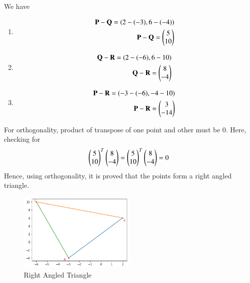 \documentclass[journal,12pt,twocolumn]{IEEEtran}
\begin{document}
We have 
\begin{enumerate}
    
    \item \begin{align}
    \mathbf{P-Q} = (2-(-3), 6-(-4))
\\
\mathbf{P-Q} = \begin{pmatrix}
5\\
10 
\end{pmatrix}
\end{align}
    \item \begin{align}
    \mathbf{Q-R} = (2-(-6), 6-10)
\\
\mathbf{Q-R} = \begin{pmatrix}
8\\
-4 
\end{pmatrix}
\end{align}
\item \begin{align}
    \mathbf{P-R} = (-3-(-6), -4-10)
\\
\mathbf{P-R} = \begin{pmatrix}
3\\
-14 
\end{pmatrix}
\end{align}
\end{enumerate}
For orthogonality, product of transpose of one point and other must be 0. 
Here, checking for 
\begin{align}
    \begin{pmatrix}
5\\
10 
\end{pmatrix}^T\begin{pmatrix} 8\\
-4
\end{pmatrix} =  \begin{pmatrix}
5\\
10
\end{pmatrix}^T \begin{pmatrix}
8 \\ -4
\end{pmatrix}=0
\end{align}
Hence, using orthogonality, it is proved that the points form a right angled triangle. 

\begin{figure}[!]
\caption*{Right Angled Triangle}
\centering
\includegraphics[width=0.5\textwidth]{Figure_1}
\end{figure}
\end{document}
